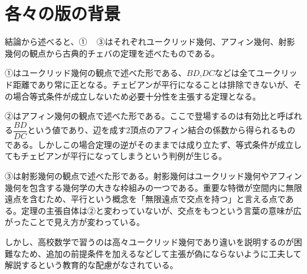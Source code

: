 \documentclass[a4paper,12pt]{bxjsbook}
\newlength{\customindent}
\newenvironment{body}{
  \par
  \begingroup
  \setlength{\leftskip}{\customindent}
  \setlength{\rightskip}{0pt}
  \setlength{\parindent}{1em}
  \setlength{\displayindent}{\customindent}
  \setlength{\displaywidth}{\dimexpr\linewidth-\customindent\relax}
}{
  \par
  \endgroup
}
\theoremstyle{theorem}
\begin{document}
    \section{各々の版の背景}

    \begin{body}
        \indent 結論から述べると、① ~ ③はそれぞれユークリッド幾何、アフィン幾何、射影幾何の観点から古典的チェバの定理を述べたものである。

        \indent ①はユークリッド幾何の観点で述べた形である、$BD$,$DC$などは全てユークリッド距離であり常に正となる。チェビアンが平行になることは排除できないが、その場合等式条件が成立しないため必要十分性を主張する定理となる。

        \indent ②はアフィン幾何の観点で述べた形である。ここで登場するのは有効比と呼ばれる$\dfrac{BD}{DC}$という値であり、辺を成す$2$頂点のアフィン結合の係数から得られるものである。しかしこの場合定理の逆がそのままでは成り立たず、等式条件が成立してもチェビアンが平行になってしまうという判例が生じる。

        \indent ③は射影幾何の観点で述べた形である。射影幾何はユークリッド幾何やアフィン幾何を包含する幾何学の大きな枠組みの一つである。重要な特徴が空間内に無限遠点を含むため、平行という概念を「無限遠点で交点を持つ」と言える点である。定理の主張自体は②と変わっていないが、交点をもつという言葉の意味が広がったことで見え方が変わっている。

        \indent しかし、高校数学で習うのは高々ユークリッド幾何であり違いを説明するのが困難なため、追加の前提条件を加えるなどして主張が偽にならないように工夫して解説するという教育的な配慮がなされている。
    \end{body}
\end{document}
